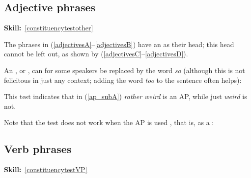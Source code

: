 \documentclass{article}
\begin{document}
\subsection{Adjective phrases}
\hfill{}\textbf{Skill:}~\ref{constituencytestother}

The phrases in (\ref{adjectivesA}--\ref{adjectivesB}) have an  as their head; this head cannot be left out, as shown by (\ref{adjectivesC}--\ref{adjectivesD}).
\begin{exe}
\end{exe}

An , or , can for some speakers be replaced by the word \emph{so} (although this is not felicitous in just any context; adding the word \emph{too} to the sentence often helps):
\begin{exe}
\end{exe}

This test indicates that in (\ref{ap_subA}) \emph{rather weird} is an AP, while just \emph{weird} is not.
\begin{exe}
\end{exe}
Note that the test does not work when the AP is used , that is, as a :
\begin{exe}
\end{exe}

\subsection{Verb phrases}
\hfill{}\textbf{Skill:}~\ref{constituencytestVP}
\end{document}
